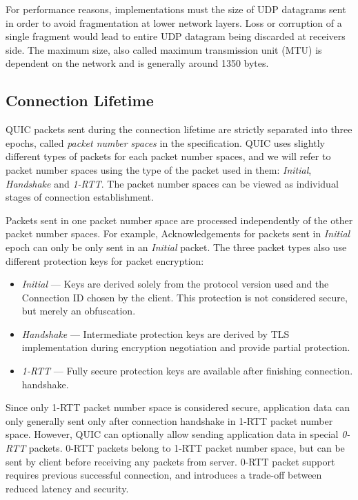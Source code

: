 For performance reasons, implementations must the size of UDP datagrams sent in order to avoid
fragmentation at lower network layers. Loss or corruption of a single fragment would lead to entire
UDP datagram being discarded at receivers side. The maximum size, also called maximum transmission
unit (MTU) is dependent on the network and is generally around 1350 bytes.

\subsection{Connection Lifetime}

QUIC packets sent during the connection lifetime are strictly separated into three epochs, called
\textit{packet number spaces} in the specification. QUIC uses slightly different types of packets
for each packet number spaces, and we will refer to packet number spaces using the type of the
packet used in them: \textit{Initial}, \textit{Handshake} and \textit{1-RTT}. The packet number
spaces can be viewed as individual stages of connection establishment.

Packets sent in one packet number space are processed independently of the other packet number
spaces. For example, Acknowledgements for packets sent in \textit{Initial} epoch can only be only
sent in an \textit{Initial} packet. The three packet types also use different protection keys for
packet encryption:

\begin{itemize}

  \item \textit{Initial} --- Keys are derived solely from the protocol version used and the
    Connection ID chosen by the client. This protection is not considered secure, but merely an
    obfuscation.

  \item \textit{Handshake} --- Intermediate protection keys are derived by TLS implementation during
    encryption negotiation and provide partial protection.

  \item \textit{1-RTT} --- Fully secure protection keys are available after finishing connection.
    handshake.

\end{itemize}

Since only 1-RTT packet number space is considered secure, application data can only generally sent
only after connection handshake in 1-RTT packet number space. However, QUIC can optionally allow
sending application data in special \textit{0-RTT} packets. 0-RTT packets belong to 1-RTT packet
number space, but can be sent by client before receiving any packets from server. 0-RTT packet
support requires previous successful connection, and introduces a trade-off between reduced latency
and security.



